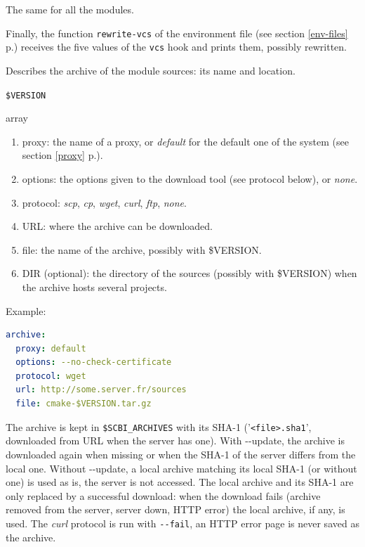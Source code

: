 \documentclass[a4paper,12pt,twoside]{article}
\newcommand{\code}[1]{\texttt{#1}}
\renewcommand{\emph}[1]{\textit{#1}}
\newcommand{\seeref}[1]{see section \ref{#1} p.\pageref{#1}}
\newcommand{\file}[1]{'{\texttt{#1}}'}
\newcommand{\ddash}{-{}-}
\begin{document}
\begin{description}[font=\large\texttt]
\begin{description}[style=standard]
		\item[\code{SCBI\_VCS\_VARIANT}] The same for all the modules.
	\end{description}

	Finally, the function \code{rewrite-vcs} of the environment
	file (\seeref{env-files}) receives the five values of the
	\code{vcs} hook and prints them, possibly rewritten.

	\item[archive {[}<variant>{]}] \label{hookarchive}Describes the archive of the module sources: its name and location.
	\begin{description}[font=\textit,style=standard]
		\item[parameter] \tabto{2cm} \code{\$VERSION}
		\item[return] \tabto{2cm} array
		\begin{enumerate}
		\item proxy: the name of a proxy, or \emph{default} for the default one of the system (\seeref{proxy}).
		\item options: the options given to the download tool (see protocol below), or \emph{none}.
		\item protocol: \emph{scp}, \emph{cp}, \emph{wget}, \emph{curl}, \emph{ftp}, \emph{none}.
		\item URL: where the archive can be downloaded.
		\item file: the name of the archive, possibly with \$VERSION.
		\item DIR (optional): the directory of the sources (possibly with \$VERSION) when the archive hosts several projects.
		\end{enumerate}
	\end{description}

	Example:
	\begin{lstlisting}[language={yaml}]
archive:
  proxy: default
  options: --no-check-certificate
  protocol: wget
  url: http://some.server.fr/sources
  file: cmake-$VERSION.tar.gz
\end{lstlisting}

	The archive is kept in \code{\$SCBI\_ARCHIVES} with its SHA-1
	(\file{<file>.sha1}, downloaded from URL when the server has
	one). With \ddash{}update, the archive is downloaded again when
	missing or when the SHA-1 of the server differs from the local
	one. Without \ddash{}update, a local archive matching its local
	SHA-1 (or without one) is used as is, the server is not
	accessed. The local archive and its SHA-1 are only replaced by a
	successful download: when the download fails (archive removed
	from the server, server down, HTTP error) the local archive, if
	any, is used. The \emph{curl} protocol is run with
	\code{\ddash{}fail}, an HTTP error page is never saved as the
	archive.


\end{description}
\end{document}
